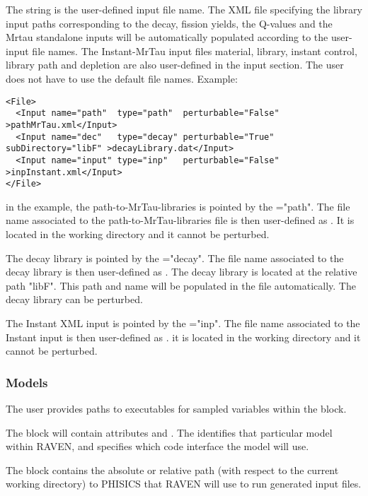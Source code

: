 The  string is the user-defined input file name.
The XML file specifying the library input paths corresponding to the decay, fission yields, the Q-values and the Mrtau standalone inputs will be automatically populated according to the user-input file names.
The Instant-MrTau input files material, library, instant control, library path and depletion are also user-defined in the input section. The user does not have to use the default file names.
Example:
\begin{lstlisting}[style=XML]
<File>
  <Input name="path"  type="path"  perturbable="False"                    >pathMrTau.xml</Input>
  <Input name="dec"   type="decay" perturbable="True" subDirectory="libF" >decayLibrary.dat</Input>
  <Input name="input" type="inp"   perturbable="False"                    >inpInstant.xml</Input>
</File>
\end{lstlisting}
in the example, the path-to-MrTau-libraries is pointed by the ="path". The file name associated to the path-to-MrTau-libraries file is then user-defined as .
It is located in the working directory and it cannot be perturbed.

The decay library is pointed by the ="decay". The file name associated to the decay library is then user-defined as .
The decay library is located at the relative path "libF". This path and name will be populated in the  file automatically. The decay library can be perturbed.

The Instant XML input is pointed by the ="inp". The file name associated to the Instant input is then user-defined as .
it is located in the working directory and it cannot be perturbed.
%
\subsubsection{Models}
\label{subsubsection:PhisicsModel}
The user provides paths to executables for sampled variables within the  block.

The  block will contain attributes  and
. The  identifies that particular  model within RAVEN, and
 specifies which code interface the model will use.

The  block contains the absolute or relative path (with respect to the current working directory)
to PHISICS that RAVEN will use to run generated input files.


